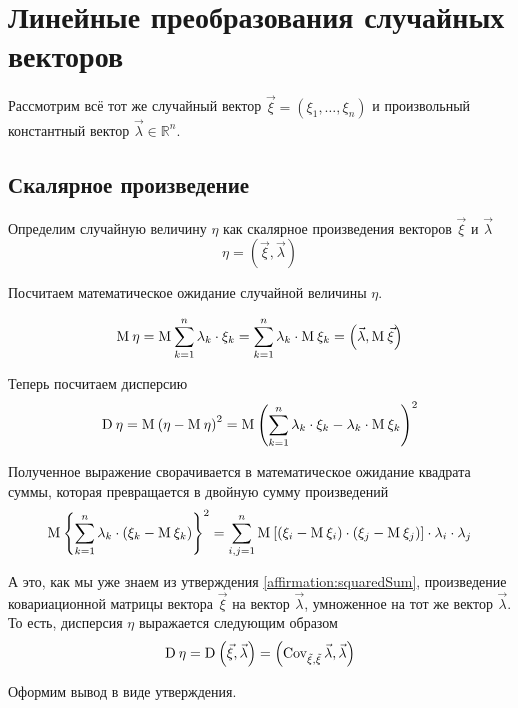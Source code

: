 \section{Линейные преобразования случайных векторов}
\label{section:linearTransformations}

Рассмотрим всё тот же случайный вектор $\vec{\xi} = \left( \xi_1, \dots, \xi_n
\right)$ и произвольный константный вектор $\vec{\lambda} \in \mathbb{R}^n$.

\subsection{Скалярное произведение}
Определим случайную величину $\eta$ как скалярное произведения векторов
$\vec{\xi}$ и $\vec{\lambda}$
$$\eta = \left( \vec{\xi}, \vec{\lambda} \right)$$

Посчитаем математическое ожидание случайной величины $\eta$.

\begin{equation}\label{eq:scalarMulMean}
    \operatorname{M}_{} \eta
        = \operatorname{M}_{} \sum_{k=1}^{n} \lambda_k \cdot \xi_k
        = \sum_{k=1}^{n} \lambda_k \cdot \operatorname{M}_{} \xi_k
        = \left( \vec{\lambda}, \operatorname{M}_{} \vec{\xi} \right)
\end{equation}

Теперь посчитаем дисперсию
$$\operatorname{D}_{} \eta
    = \operatorname{M}_{} \left( \eta - \operatorname{M}_{} \eta \right)^2
    = \operatorname{M}_{} \left( \sum_{k=1}^{n} \lambda_k \cdot \xi_k
        - \lambda_k \cdot \operatorname{M}_{} \xi_k \right)^2$$

Полученное выражение сворачивается в математическое ожидание квадрата суммы,
которая превращается в двойную сумму произведений
$$\operatorname{M}_{} \left\{ \sum_{k=1}^{n} \lambda_k
    \cdot \left( \xi_k - \operatorname{M}_{} \xi_k \right) \right\}^2
    = \sum_{i,j=1}^{n}\operatorname{M}_{} \left[ \left( \xi_i - \operatorname{M}_{} \xi_i \right)
            \cdot \left( \xi_j - \operatorname{M}_{} \xi_j \right) \right]
        \cdot \lambda_i \cdot \lambda_j$$

А это, как мы уже знаем из утверждения \ref{affirmation:squaredSum},
произведение ковариационной матрицы вектора $\vec{\xi}$
на вектор $\vec{\lambda}$, умноженное на тот же вектор $\vec{\lambda}$.
То есть, дисперсия $\eta$ выражается следующим образом
\begin{equation}\label{eq:linearQuadraticForm}
\operatorname{D}_{} \eta
    = \operatorname{D}_{} \left( \vec{\xi}, \vec{\lambda} \right)
    = \left( \operatorname{Cov^{}_{\vec{\xi}, \vec{\xi}}} \vec{\lambda}, \vec{\lambda} \right)
\end{equation}

Оформим вывод в виде утверждения.

